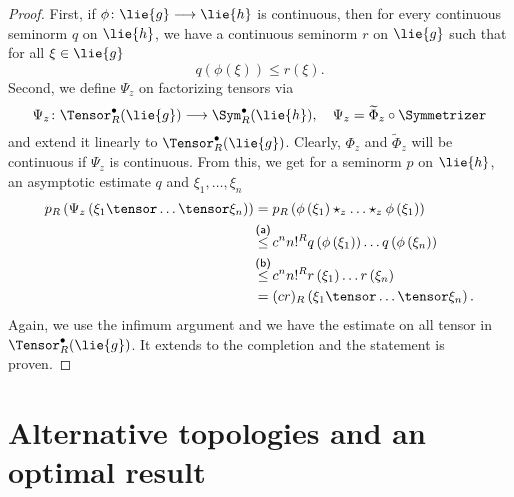 \begin{proof}
	First, if $\phi \colon \lie{g} \longrightarrow \lie{h}$ is continuous, 
	then for every continuous seminorm $q$ on $\lie{h}$, we have a continuous 
	seminorm $r$ on $\lie{g}$ such that for all $\xi \in \lie{g}$
	\begin{equation*}
		q\left( \phi(\xi) \right)
		\leq
		r(\xi).
	\end{equation*}
	Second, we define $\Psi_z$ on factorizing tensors via
	\begin{equation*}
		\Psi_z \colon
		\Tensor_R^{\bullet}(\lie{g})
		\longrightarrow
		\Sym_R^{\bullet}(\lie{h})
		, \quad
		\Psi_z
		=
		\widetilde{\Phi}_z \circ
		\Symmetrizer
	\end{equation*}
	and extend it linearly to $\Tensor_R^{\bullet}(\lie{g})$. Clearly, 
	$\Phi_z$ and $\widetilde{\Phi}_z$ will be continuous if $\Psi_z$ is 
	continuous. From this, we get for a seminorm $p$ on $\lie{h}$, an 
	asymptotic estimate $q$ and $\xi_1, \ldots, \xi_n$
	\begin{align*}
		p_R\left(
			\Psi_z \left(
				\xi_1 \tensor \ldots \tensor \xi_n
			\right)
		\right)
		& =
		p_R \left(
			\phi \left( \xi_1 \right)
			\star_z \ldots \star_z
			\phi \left( \xi_1 \right)
		\right)
		\\
		& \ot{(a)}{\leq}
		c^n n!^R
		q \left( \phi \left( \xi_1 \right) \right)
		\ldots
		q \left( \phi \left( \xi_n \right) \right)
		\\
		& \ot{(b)}{\leq}
		c^n n!^R
		r \left( \xi_1 \right)
		\ldots
		r \left( \xi_n \right)
		\\
		& =
		(c r)_R\left( 
			\xi_1 \tensor \ldots \tensor \xi_n
		\right).
	\end{align*}
	Again, we use the infimum argument and we have the estimate on all tensor 
	in $\Tensor_R^{\bullet}(\lie{g})$. It extends to the completion and the 
	statement is proven.
\end{proof}



\section{Alternative topologies and an optimal result}
\label{sec:chap5_Optimality}


